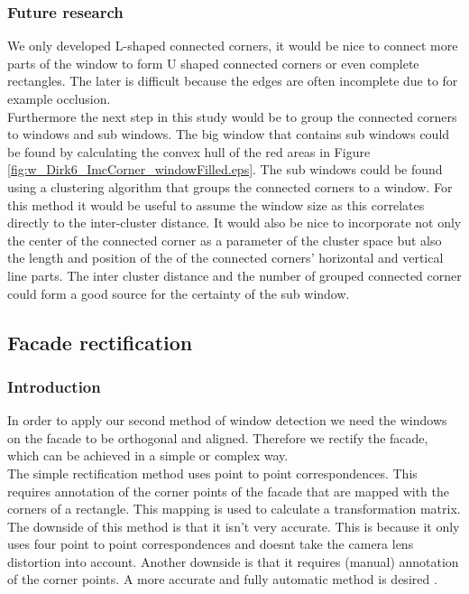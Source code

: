 \subsubsection{Future research} %
We only developed L-shaped connected corners, it would be nice to connect more
parts of the window to form U shaped connected corners or even complete rectangles.
The later is difficult because the edges are often incomplete due to for example occlusion.\\

Furthermore the next step in this study would be to group the connected corners
to windows and sub windows.  The big window that contains sub windows could be
found by calculating the convex hull of the red areas in Figure
\ref{fig:w_Dirk6_ImcCorner_windowFilled.eps}.  The sub windows could be found
using a clustering algorithm that groups the connected corners to a window. For
this method it would be useful to assume the window size as this correlates
directly to the inter-cluster distance.  It would also be nice to incorporate
not only the center of the connected corner as a parameter of the cluster space
but also the length and position of the of the connected corners' horizontal
and vertical line parts.  The inter cluster distance and the number of grouped
connected corner could form a good source for the certainty of the sub
window.\\







\subsection{Facade rectification}
\subsubsection{Introduction}
In order to apply our second method of window detection
we need the windows on the facade to be orthogonal and aligned.
Therefore we rectify the facade, which can be achieved in a simple or complex way.\\

The simple rectification method uses point to point correspondences. This 
requires annotation of the corner points of the facade that are mapped with the
corners of a rectangle. This mapping is used to calculate a transformation matrix. 
 The downside of this method is that it isn't very accurate.
This is because it only uses four point to point correspondences 
 and doesnt take the camera lens distortion into account.
 Another downside is that it requires (manual) annotation of the corner points.
A more accurate and fully automatic method is desired .\\

